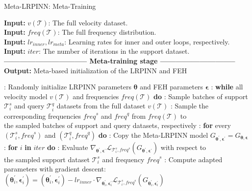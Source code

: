 \begin{algorithm}
\caption{Meta-LRPINN: Meta-Training}\label{alg1}
\textbf{Input:} ${v(\mathcal{T})}$: The full velocity dataset. \\
\textbf{Input:} ${\textit{freq}(\mathcal{T})}$: The full frequency distribution. \\
\textbf{Input:} ${lr_{inner}, lr_{meta}}$: Learning rates for inner and outer loops, respectively. \\
\textbf{Input:} ${iter}$: The number of iterations in the support dataset. \\
\textbf{-------------------------------- Meta-training stage -----------------------------} \\
\textbf{Output:} Meta-based initialization of the LRPINN and FEH
\begin{algorithmic}
: Randomly initialize LRPINN parameters $\boldsymbol{\theta}$ and FEH parameters $\boldsymbol{\epsilon}$
: \textbf{while} all velocity model ${v(\mathcal{T})}$ and frequencies ${\textit{freq}(\mathcal{T})}$ \textbf{do}
: \quad Sample batches of support $\mathcal{T}_i^s$ and query $\mathcal{T}_i^q$ datasets from the full dataset $v(\mathcal{T})$
: \quad Sample the corresponding frequencies $\textit{freq}^s$ and $\textit{freq}^q$ from ${\textit{freq}(\mathcal{T})}$ to \\
\quad \quad \quad \quad \quad \quad the sampled batches of support and query datasets, respectively
: \quad \textbf{for} every $(\mathcal{T}_i^s, \textit{freq}^s)$ and $(\mathcal{T}_i^q, \textit{freq}^q)$ \textbf{do}
: \quad \quad Copy the Meta-LRPINN model $G_{\boldsymbol{\theta}^{'}, \boldsymbol{\epsilon}^{'}} = G_{\boldsymbol{\theta}, \boldsymbol{\epsilon}}$
: \quad \quad \textbf{for} ${i}$ \textbf{in} ${iter}$ \textbf{do}
: \quad \quad \quad \quad Evaluate $\nabla_{\boldsymbol{\theta}^{'}, \boldsymbol{\epsilon}^{'}} \mathcal{L}_{\mathcal{T}_i^s, \textit{freq}^s} \left( G_{\boldsymbol{\theta}^{'}, \boldsymbol{\epsilon}^{'}} \right)$ with respect to \\
\quad \quad \quad \quad \quad \quad \quad \quad \quad the sampled support dataset $\mathcal{T}_i^s$ and frequency $\textit{freq}^s$
: \quad \quad \quad \quad Compute adapted parameters with gradient descent: \\
\quad \quad \quad \quad \quad \quad \quad \quad \quad $(\boldsymbol{\theta}_i^{'}, \boldsymbol{\epsilon}_i^{'})  = (\boldsymbol{\theta}_i^{'}, \boldsymbol{\epsilon}_i^{'}) - lr_{inner} \cdot \nabla_{\boldsymbol{\theta}_i^{'}, \boldsymbol{\epsilon}_i^{'}} \mathcal{L}_{\mathcal{T}_i^s, \textit{freq}^s} \left( G_{\boldsymbol{\theta}_i^{'}, \boldsymbol{\epsilon}_i^{'}} \right)$

\end{algorithmic}
\end{algorithm}
